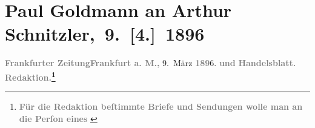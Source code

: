 

         
         \newcommand{\erwaehntePersonen}{Personen: Lou Andreas-Salomé,  Angelus Silesius, Richard Beer-Hofmann, Gustav Davis, Stefan George, Hugo von Hofmannsthal, Rudolf Lothar, Johanna Mamroth, Fedor Mamroth, Felix Salten}
         \newcommand{\erwaehnteInstitutionen}{Institutionen: Burgtheater, Frankfurter Zeitung}
         \newcommand{\erwaehnteOrte}{Orte: Dänemark, Frankfurt am Main, Niddastraße, Niederlande, Paris, Wien}
         \newcommand{\erwaehnteWerke}{Werke: Anatol, Cherubinischer Wandersmann, Die Zeit. Wiener Wochenschrift, Freiwild. Schauspiel in 3 Akten, Gedichte von Stefan George, Geistreiche Sinn- und Schlussreime, Ruth. Erzählung}
               \section[ Paul Goldmann an Arthur Schnitzler, 9. {[}4.{]} 1896]{ Paul Goldmann an Arthur Schnitzler, 9. {[}4.{]} 1896}\nopagebreak{}\rehead{ }\begin{ledgroupsized}[t]{13cm}\normalsize\beginnumbering \toendnotes[C]{\smallbreak\pagebreak[2]} 
\toendnotes[C]{\smallbreak}\pstart
           \noindent{}{\pb}\textcolor{gray}{\textbf{\textbf{Frankfurter Zeitung}}}\hfill \textcolor{gray}{\textbf{Frankfurt a. M., }}9. März \textcolor{gray}{\textbf{189}}6.\pend
           \pstart
           \textcolor{gray}{\textbf{und}}\pend
           \pstart
           \textcolor{gray}{\textbf{Handelsblatt.}}\pend
           \pstart
           \textcolor{gray}{\textbf{\textbf{Redaktion.\footnote{\noindent{}\textcolor{gray}{\textbf{Für die Redaktion beſtimmte Briefe und Sendungen
                                 wolle man  an die Perſon eines
}}}}}}
\end{ledgroupsized}
